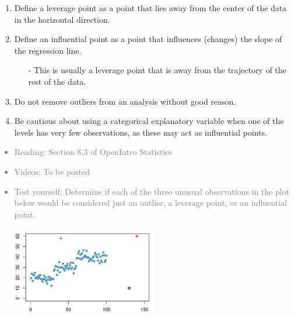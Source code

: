 \documentclass[11pt]{article}
\newcommand{\gray}[1]{\textcolor{gray}{#1}}
\begin{document}
%

\vspace{0.48cm}

%

\begin{enumerate}[resume]
\renewcommand\labelenumi{\textcolor{light}{\textbf{LO \theenumi.}}}

\item Define a leverage point as a point that lies away from the center of the data in the horizontal direction.

\item Define an influential point as a point that influences (changes) the slope of the regression line.
\begin{itemize}
\item[-] This is usually a leverage point that is away from the trajectory of the rest of the data.
\end{itemize}

\item Do not remove outliers from an analysis without good reason.

\item Be cautious about using a categorical explanatory variable when one of the levels has very few observations, as these may act as influential points.

\end{enumerate}

\gray{
{\it
\vspace{-0.55cm}
\begin{itemize}
\renewcommand{\labelitemi}{{\textcolor{dark}{$\ast$}}}
\item Reading: Section 8.3 of OpenIntro Statistics
\item Videos: To be posted 
\item Test yourself: Determine if each of the three unusual observations in the plot below would be considered just an outlier, a leverage point, or an influential point.
\begin{center}
\includegraphics[width=0.5\textwidth]{figures/outliers}
\end{center}
\end{itemize}
}}
\end{document}
